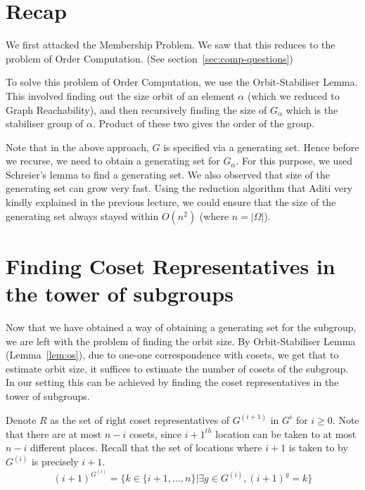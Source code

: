 
\section{Recap}
We first attacked the Membership Problem. We saw that this reduces to the
problem of Order Computation. (See section~\ref{sec:comp-questions}) 

To solve this problem of Order Computation, we use the
Orbit-Stabiliser Lemma. This involved finding out the size orbit of an element
$\alpha$ (which we reduced to Graph Reachability), and then recursively
finding the size of $G_\alpha$ which is the stabiliser group of $\alpha$.
Product of these two gives the order of the group.

Note that in the above approach, $G$ is specified via a generating set. Hence
before we recurse, we need to obtain a generating set for
$G_\alpha$. For this purpose, we used Schreier's lemma to find a generating
set. We also observed that size of the generating set can grow very fast. Using
the reduction algorithm that Aditi very kindly explained in the previous
lecture, we could ensure that the size of the generating set always stayed 
within $O(n^2)$ (where $n = |\Omega|$).

\section{Finding Coset Representatives in the tower of subgroups}
\label{sec:find-coset}
Now that we have obtained a way of obtaining a generating set for the
subgroup, we are left with the problem of finding the orbit size. 
By Orbit-Stabiliser Lemma (Lemma~\ref{lem:os}), due to one-one correspondence
with cosets, we get that to estimate orbit size, it suffices to estimate the
number of cosets of the subgroup. In our setting this can be achieved by
finding the coset representatives in the tower of subgroups.

Denote $R$ as the set of right coset representatives of $G^{(i+1)}$  in $G^i$
for $i \ge 0$. Note that there are at most  $n-i$ cosets, since $i+1^{th}$
location can be taken to at most $n-i$ different places. Recall that the set of
locations where $i+1$ is taken to by $G^{(i)}$ is precisely $i+1$.
\[ (i+1)^{G^{(i)}}=\{ k \in \{i+1, \ldots, n\} | \exists g \in G^{(i)},
(i+1)^g = k\} \]

